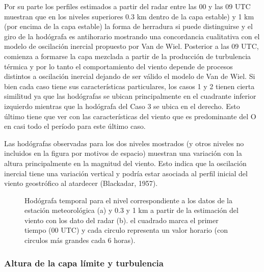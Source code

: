 \documentclass[12pt,spanish,oneside, a4paper]{book}
\begin{document}
Por su parte los perfiles estimados a partir del radar entre las 00 y
las 09 UTC muestran que en los niveles superiores 0.3 km dentro de la
capa estable) y 1 km (por encima de la capa estable) la forma de
herradura si puede distinguirse y el giro de la hodógrafa es antihorario
mostrando una concordancia cualitativa con el modelo de oscilación
inercial propuesto por Van de Wiel. Posterior a las 09 UTC, comienza a
formarse la capa mezclada a partir de la producción de turbulencia
térmica y por lo tanto el comportamiento del viento depende de procesos
distintos a oscilación inercial dejando de ser válido el modelo de Van
de Wiel. Si bien cada caso tiene sus características particulares, los
casos 1 y 2 tienen cierta similitud ya que las hodógrafas se ubican
principalmente en el cuadrante inferior izquierdo mientras que la
hodógrafa del Caso 3 se ubica en el derecho. Esto último tiene que ver
con las características del viento que es predominante del O en casi
todo el período para este último caso.

Las hodógrafas observadas para los dos niveles mostrados (y otros
niveles no incluidos en la figura por motivos de espacio) muestran una
variación con la altura principalmente en la magnitud del viento. Esto
indica que la oscilación inercial tiene una variación vertical y podría
estar asociada al perfil inicial del viento geostrófico al atardecer
(Blackadar, 1957).

\begin{figure}

{\centering {}\newline{}

}

\caption{Hodógrafa temporal para el nivel correspondiente a los datos de la estación meteorológica (a) y 0.3 y 1 km a partir de la estimación del viento con los dato del radar (b). el cuadrado marca el primer tiempo (00 UTC) y cada circulo representa un valor horario (con circulos más grandes cada 6 horas). \label{hodografa-n}}\label{fig:hodografa-nivel}
\end{figure}

\subsubsection{Altura de la capa límite y
turbulencia}\label{altura-de-la-capa-limite-y-turbulencia}
\end{document}
